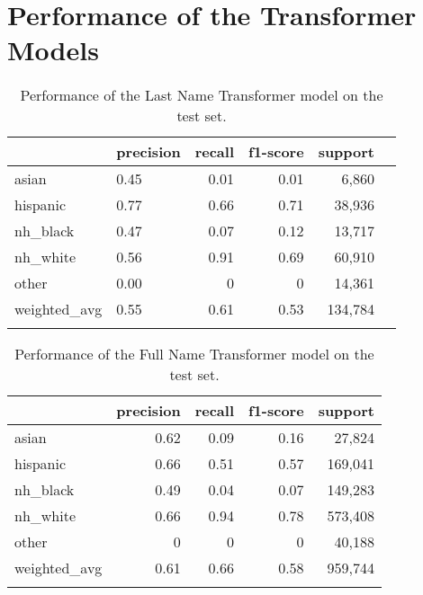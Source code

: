 \documentclass[12pt, letterpaper]{article}
\begin{document}
\clearpage
\section{Performance of the Transformer Models}\label{transformer_perf}

\begin{table}[h!]
\centering
\caption{Performance of the Last Name Transformer model on the test set.}
\begin{tabular}{llrrrr}
\hline
          & precision   &   recall &   f1-score &   support \\
\hline
  asian      &  0.45     &  0.01    &   0.01   &    6,860\\
 hispanic & 0.77        &     0.66 &       0.71 &  38,936    \\
 nh\_black & 0.47        &     0.07 &       0.12 &  13,717    \\
 nh\_white & 0.56        &     0.91 &       0.69 &  60,910    \\
 other    & 0.00        &     0    &       0    &  14,361    \\
 weighted\_avg  &      0.55 &       0.61 &      0.53 & 134,784 \\
\hline
\label{table:transformer_last_name}
\end{tabular}
\end{table}

\begin{table}[h!]
\centering
\caption{Performance of the Full Name Transformer model on the test set.}
\begin{tabular}{lrrrr}
\hline
              &   precision &   recall &   f1-score &   support \\
\hline
  asian      & 0.62  &    0.09  &    0.16    & 27,824\\
 hispanic     &        0.66 &     0.51 &       0.57 &    169,041 \\
 nh\_black     &        0.49 &     0.04 &       0.07 &    149,283 \\
 nh\_white     &        0.66 &     0.94 &       0.78 &    573,408 \\
 other        &        0    &     0    &       0    &     40,188 \\
 weighted\_avg &        0.61 &     0.66 &       0.58 &    959,744 \\
\hline
\label{table:transformer_full_name}
\end{tabular}
\end{table}
\end{document}
